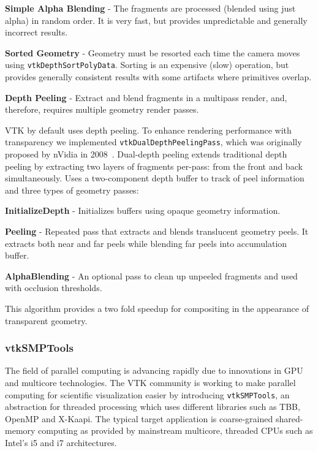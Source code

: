 \begin{compactitem}
\item \textbf{Simple Alpha Blending} - The fragments are processed (blended using just alpha) in random order.
  It is very fast, but provides unpredictable and generally incorrect results.
\item \textbf{Sorted Geometry} - Geometry must be resorted each time the camera moves using \texttt{vtkDepthSortPolyData}.
  Sorting is an expensive (slow) operation, but provides generally consistent results with some artifacts where primitives overlap.
\item \textbf{Depth Peeling} - Extract and blend fragments in a multipass render, and, therefore, requires multiple geometry render passes.
\end{compactitem}

VTK by default uses depth peeling.
To enhance rendering performance with transparency we implemented \texttt{vtkDualDepthPeelingPass}, which was originally proposed by nVidia in 2008~\cite{Bavoil:2008}.
Dual-depth peeling extends traditional depth peeling by extracting two layers of fragments per-pass: from the front and back simultaneously.
Uses a two-component depth buffer to track of peel information and three types of geometry passes:

\begin{compactitem}
\item \textbf{InitializeDepth} - Initializes buffers using opaque geometry information.
\item \textbf{Peeling} - Repeated pass that extracts and blends translucent geometry peels.
  It extracts both near and far peels while blending far peels into accumulation buffer.
\item \textbf{AlphaBlending} - An optional pass to clean up unpeeled fragments and used with occlusion thresholds.
\end{compactitem}

This algorithm provides a two fold speedup for compositing in the appearance of transparent geometry.

\subsubsection{vtkSMPTools}

The field of parallel computing is advancing rapidly due to innovations in GPU and multicore technologies.
The VTK community is working to make parallel computing for scientific visualization easier by introducing \texttt{vtkSMPTools}, an abstraction for threaded processing which uses different libraries such as TBB, OpenMP and X-Kaapi.
The typical target application is coarse-grained shared-memory computing as provided by mainstream multicore, threaded CPUs such as Intel's i5 and i7 architectures.

